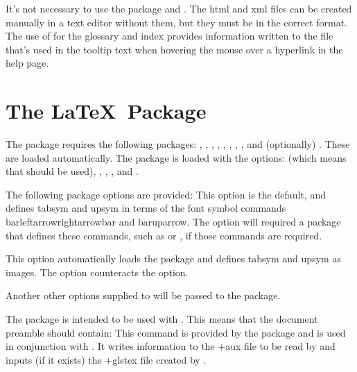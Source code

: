 \documentclass[toc=listof]{scrreport}
\begin{document}
\begin{information}
It's not necessary to use the  package and .
The \gls{html} and \gls{xml} files can be created manually in a text editor 
without them, but they must be in the correct format. The use of 
for the glossary and index provides information written to the 
file that's used in the tooltip text when hovering the mouse over a hyperlink
in the help page.
\end{information}

\chapter{The  \LaTeX\ Package}
\label{sec:texjavahelpsty}


The  package requires the following packages:
, , ,
, , , , ,
and (optionally) . These are loaded automatically.
The  package is loaded with the options:
 (which means that  should be used),
, , , 
and .

The following  package options are provided:
This option is the default, and defines \gls{tabsym} and \gls{upsym} in terms of
the font symbol commands \gls{barleftarrowrightarrowbar}
and \gls{baruparrow}. The  option will required a package that defines
these commands, such as  or , if those commands are required.

This option automatically loads the  package and 
defines \gls{tabsym} and \gls{upsym} as images.
The  option counteracts the  option.

Another other options supplied to  will be passed to
the  package.

The  package is intended to be used with . This means
that the document preamble should contain:
This command is provided by the  package and is used 
in conjunction with . It writes information
to the \ext+{aux} file to be read by  and inputs
(if it exists) the \ext+{glstex} file created by .
\end{document}
